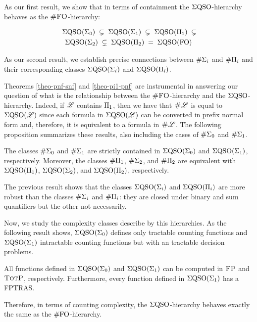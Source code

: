 As our first result, we show that in terms of containment the $\Sigma{\rm QSO}$-hierarchy behaves as the $\text{\sc \#FO}$-hierarchy:
\begin{proposition}
\begin{multline*}
\; \Sigma{\rm QSO}(\Sigma_{0}) \; \subsetneq \; \Sigma{\rm QSO}(\Sigma_{1}) \; \subsetneq \; \Sigma{\rm QSO}(\Pi_{1}) \; \subsetneq \\ \Sigma{\rm QSO}(\Sigma_{2}) \; \subsetneq \; \Sigma{\rm QSO}(\Pi_{2}) \; = \; \Sigma{\rm QSO}({\rm FO})
\end{multline*}
\end{proposition}
As our second result, we establish precise connections between 
$\#\Sigma_{i}$ and $\#\Pi_{i}$ and their corresponding classes $\Sigma{\rm QSO}(\Sigma_{i})$ and $\Sigma{\rm QSO}(\Pi_{i})$. 






Theorems \ref{theo-pnf-snf} and \ref{theo-pi1-pnf} are instrumental in answering our question of what is the relationship between the $\text{\sc \#FO}$-hierarchy and the $\Sigma{\rm QSO}$-hierarchy. 
Indeed, if $\mathscr{L}$ contains $\Pi_{1}$, then we have that $\text{\sc \#} \mathscr{L}$ is equal to $\Sigma{\rm QSO}(\mathscr{L})$ since each formula in $\Sigma{\rm QSO}(\mathscr{L})$ can be converted in prefix normal form and, therefore, it is equivalent to a formula in $\text{\sc \#} \mathscr{L}$. 
The following proposition summarizes these results, also including the cases of $\#\Sigma_{0}$ and $\#\Sigma_{1}$.
\begin{proposition}
	The classes $\#\Sigma_{0}$ and $\#\Sigma_{1}$ are strictly contained in $\Sigma{\rm QSO}(\Sigma_{0})$ and $\Sigma{\rm QSO}(\Sigma_{1})$, respectively. Moreover, the classes $\#\Pi_{1}$, $\#\Sigma_{2}$, and $\#\Pi_{2}$ are equivalent with $\Sigma{\rm QSO}(\Pi_{1})$, $\Sigma{\rm QSO}(\Sigma_{2})$, and $\Sigma{\rm QSO}(\Pi_{2})$, respectively.
\end{proposition}
The previous result shows that the classes $\Sigma{\rm QSO}(\Sigma_{i})$ and $\Sigma{\rm QSO}(\Pi_{i})$ are more robust than the classes $\#\Sigma_{i}$ and $\#\Pi_{i}$: they are closed under binary and sum quantifiers but the other not necessarily. 

Now, we study the complexity classes describe by this hierarchies. As the following result shows, $\Sigma{\rm QSO}(\Sigma_{0})$ defines only tractable counting functions and $\Sigma{\rm QSO}(\Sigma_{1})$ intractable counting functions but with an tractable decision problems. 
\begin{proposition} \label{prop:qe0-fp-qe1-totp-fptras}
All functions defined in $\Sigma{\rm QSO}(\Sigma_{0})$ and $\Sigma{\rm QSO}(\Sigma_{1})$ can be computed in $\text{\sc FP}$ and $\text{\sc TotP}$, respectively. Furthermore, every function defined in $\Sigma{\rm QSO}(\Sigma_{1})$ has a FPTRAS.
\end{proposition}
Therefore, in terms of counting complexity, the $\Sigma{\rm QSO}$-hierarchy behaves exactly the same as the $\#{\rm FO}$-hierarchy.


